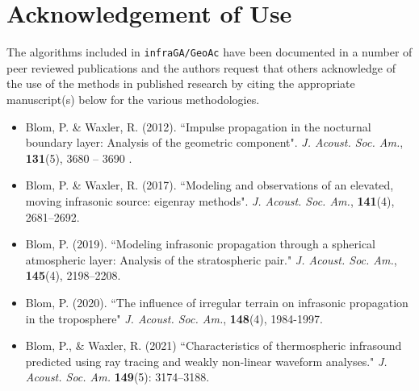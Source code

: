 \documentclass[10pt]{article}
\begin{document}
\section{Acknowledgement of Use}
The algorithms included in \verb=infraGA/GeoAc= have been documented in a number of peer reviewed publications and the authors request that others acknowledge of the use of the methods in published research by citing the appropriate manuscript(s) below for the various methodologies.
\begin{itemize}
  \item Blom, P. \& Waxler, R. (2012). ``Impulse propagation in the nocturnal boundary layer: Analysis of the geometric component". \textit{J. Acoust. Soc. Am.}, \textbf{131}(5), 3680 -- 3690 .
  \item Blom, P. \& Waxler, R. (2017). ``Modeling and observations of an elevated, moving infrasonic source: eigenray methods". \textit{J. Acoust. Soc. Am.}, \textbf{141}(4), 2681--2692.
  \item Blom, P. (2019). ``Modeling infrasonic propagation through a spherical atmospheric layer: Analysis of the stratospheric pair." \textit{J. Acoust. Soc. Am.}, \textbf{145}(4), 2198--2208.	
  \item Blom, P. (2020). ``The influence of irregular terrain on infrasonic propagation in the troposphere" \textit{J. Acoust. Soc. Am.}, \textbf{148}(4), 1984-1997.
  \item Blom, P., \& Waxler, R. (2021) ``Characteristics of thermospheric infrasound predicted using ray tracing and weakly non-linear waveform analyses." \textit{J. Acoust. Soc. Am.} \textbf{149}(5): 3174--3188.
\end{itemize}
\end{document}
